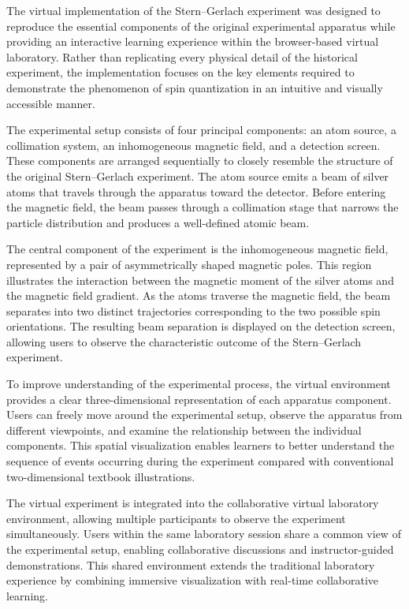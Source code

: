 The virtual implementation of the Stern--Gerlach experiment was designed to reproduce the essential components of the original experimental apparatus while providing an interactive learning experience within the browser-based virtual laboratory. Rather than replicating every physical detail of the historical experiment, the implementation focuses on the key elements required to demonstrate the phenomenon of spin quantization in an intuitive and visually accessible manner.

The experimental setup consists of four principal components: an atom source, a collimation system, an inhomogeneous magnetic field, and a detection screen. These components are arranged sequentially to closely resemble the structure of the original Stern--Gerlach experiment. The atom source emits a beam of silver atoms that travels through the apparatus toward the detector. Before entering the magnetic field, the beam passes through a collimation stage that narrows the particle distribution and produces a well-defined atomic beam.

The central component of the experiment is the inhomogeneous magnetic field, represented by a pair of asymmetrically shaped magnetic poles. This region illustrates the interaction between the magnetic moment of the silver atoms and the magnetic field gradient. As the atoms traverse the magnetic field, the beam separates into two distinct trajectories corresponding to the two possible spin orientations. The resulting beam separation is displayed on the detection screen, allowing users to observe the characteristic outcome of the Stern--Gerlach experiment.

To improve understanding of the experimental process, the virtual environment provides a clear three-dimensional representation of each apparatus component. Users can freely move around the experimental setup, observe the apparatus from different viewpoints, and examine the relationship between the individual components. This spatial visualization enables learners to better understand the sequence of events occurring during the experiment compared with conventional two-dimensional textbook illustrations.

The virtual experiment is integrated into the collaborative virtual laboratory environment, allowing multiple participants to observe the experiment simultaneously. Users within the same laboratory session share a common view of the experimental setup, enabling collaborative discussions and instructor-guided demonstrations. This shared environment extends the traditional laboratory experience by combining immersive visualization with real-time collaborative learning.

